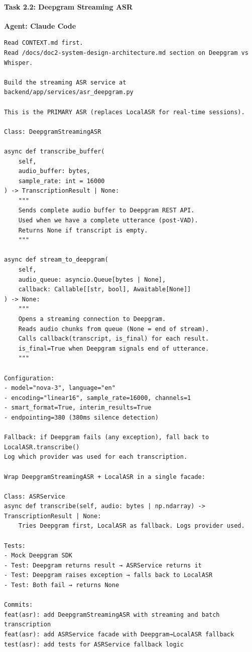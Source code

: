 \documentclass[
  11pt,
]{article}
\begin{document}
\hypertarget{task-2.2-deepgram-streaming-asr}{%
\paragraph{Task 2.2: Deepgram Streaming
ASR}\label{task-2.2-deepgram-streaming-asr}}

\textbf{Agent: Claude Code}

\begin{lstlisting}
Read CONTEXT.md first.
Read /docs/doc2-system-design-architecture.md section on Deepgram vs Whisper.

Build the streaming ASR service at backend/app/services/asr_deepgram.py

This is the PRIMARY ASR (replaces LocalASR for real-time sessions).

Class: DeepgramStreamingASR

async def transcribe_buffer(
    self,
    audio_buffer: bytes,
    sample_rate: int = 16000
) -> TranscriptionResult | None:
    """
    Sends complete audio buffer to Deepgram REST API.
    Used when we have a complete utterance (post-VAD).
    Returns None if transcript is empty.
    """

async def stream_to_deepgram(
    self,
    audio_queue: asyncio.Queue[bytes | None],
    callback: Callable[[str, bool], Awaitable[None]]
) -> None:
    """
    Opens a streaming connection to Deepgram.
    Reads audio chunks from queue (None = end of stream).
    Calls callback(transcript, is_final) for each result.
    is_final=True when Deepgram signals end of utterance.
    """

Configuration:
- model="nova-3", language="en"
- encoding="linear16", sample_rate=16000, channels=1
- smart_format=True, interim_results=True
- endpointing=380 (380ms silence detection)

Fallback: if Deepgram fails (any exception), fall back to LocalASR.transcribe()
Log which provider was used for each transcription.

Wrap DeepgramStreamingASR + LocalASR in a single facade:

Class: ASRService
async def transcribe(self, audio: bytes | np.ndarray) -> TranscriptionResult | None:
    Tries Deepgram first, LocalASR as fallback. Logs provider used.

Tests:
- Mock Deepgram SDK
- Test: Deepgram returns result → ASRService returns it
- Test: Deepgram raises exception → falls back to LocalASR
- Test: Both fail → returns None

Commits:
feat(asr): add DeepgramStreamingASR with streaming and batch transcription
feat(asr): add ASRService facade with Deepgram→LocalASR fallback
test(asr): add tests for ASRService fallback logic
\end{lstlisting}
\end{document}
